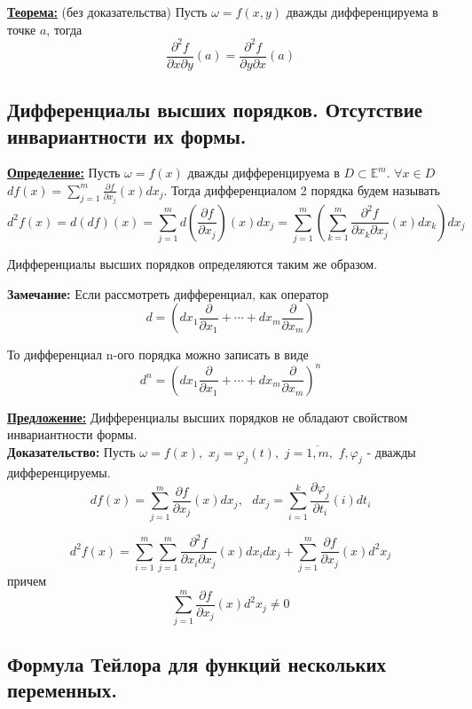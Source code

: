 \documentclass[a4paper,12pt]{article} %
\begin{document}
\underline{\textbf{Теорема:}} (без доказательства) Пусть $\omega = f(x, y)$ дважды дифференцируема в точке $a$, тогда
\[
	\frac{\partial^2f}{\partial{x}\partial{y}}(a) = \frac{\partial^2f}{\partial{y}\partial{x}}(a)
\]

\subsection{Дифференциалы высших порядков. Отсутствие инвариантности их формы.}

\underline{\textbf{Определение:}} Пусть $\omega = f(x)$ дважды дифференцируема в $D \subset \mathbb{E}^m$. $\forall x\in D $ $df(x) = \sum\limits_{j=1}^m\frac{\partial f}{\partial x_j}(x)dx_j$. Тогда дифференциалом 2 порядка будем называть
\[
	d^2f(x) =d(df)(x) = \sum\limits_{j=1}^md\left(\frac{\partial f}{\partial x_j}\right)(x)dx_j= \sum\limits_{j=1}^m\left(\sum\limits_{k=1}^m
	\frac{\partial^2f}{\partial x_k\partial x_j}(x)dx_k\right)dx_j
\]

Дифференциалы высших порядков определяются таким же образом.
\vspace{5mm}

\textbf{Замечание:} Если рассмотреть дифференциал, как оператор
\[
	d = \left(dx_1\frac{\partial}{\partial x_1}+\cdots+dx_m\frac{\partial}{\partial x_m}\right)
\]

То дифференциал n-ого порядка можно записать в виде
\[
	d^n = \left(dx_1\frac{\partial}{\partial x_1}+\cdots+dx_m\frac{\partial}{\partial x_m}\right)^n
\]

\underline{\textbf{Предложение:}} Дифференциалы высших порядков не обладают свойством инвариантности формы.\\

\textbf{Доказательство:} Пусть $\omega = f(x), $ $x_j=\varphi_j(t), $  $j=\overline{1, m}, $ $f, \varphi_j$ - дважды дифференцируемы.
\[
	df(x) = \sum\limits_{j=1}^m\frac{\partial f}{\partial x_j}(x)dx_j, \text{ }dx_j = \sum\limits_{i=1}^k\frac{\partial \varphi_j}{\partial t_i}(i)dt_i
\]

\[
	d^2f(x) = \sum\limits_{i=1}^m\sum\limits_{j=1}^m
	\frac{\partial^2f}{\partial x_i\partial x_j}(x)dx_idx_j+\sum\limits_{j=1}^m\frac{\partial f}{\partial x_j}(x)d^2x_j
\]
причем
\[
	\sum\limits_{j=1}^m\frac{\partial f}{\partial x_j}(x)d^2x_j \neq 0
\]

\subsection{Формула Тейлора для функций нескольких переменных.}
\end{document}
